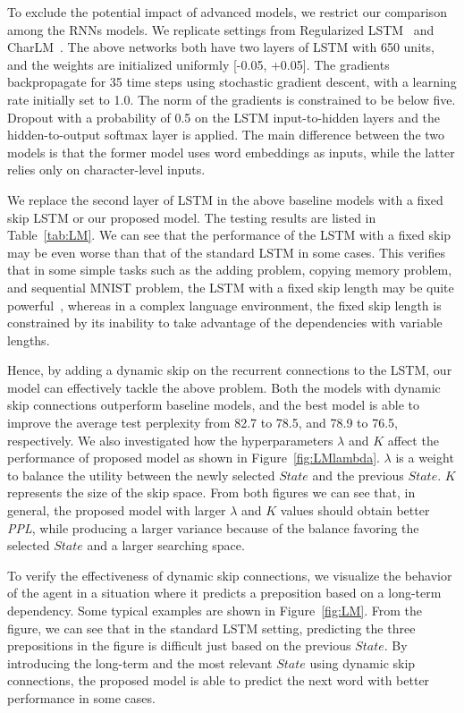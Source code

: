\documentclass[letterpaper]{article} \usepackage{aaai19}  \usepackage{times}  \usepackage{helvet}  \usepackage{courier}  \usepackage{url}  \usepackage{graphicx}  \usepackage{amsmath}
\begin{document}
To exclude the potential impact of advanced models, we restrict our comparison among the RNNs models. We replicate settings from Regularized LSTM~\cite{zaremba2014recurrent} and CharLM~\cite{kim2016character}. The above networks both have two layers of LSTM with 650 units, and the weights are initialized uniformly [-0.05, +0.05]. The gradients backpropagate for 35 time steps using stochastic gradient descent, with a learning rate initially set to 1.0. The norm of the gradients is constrained to be below five. Dropout with a probability of 0.5 on the LSTM input-to-hidden layers and the hidden-to-output softmax layer is applied. The main difference between the two models is that the former model uses word embeddings as inputs, while the latter relies only on character-level inputs.

We replace the second layer of LSTM in the above baseline models with a fixed skip LSTM or our proposed model. The testing results are listed in Table~\ref{tab:LM}. We can see that the performance of the LSTM with a fixed skip may be even worse than that of the standard LSTM in some cases. This verifies that in some simple tasks such as the adding problem, copying memory problem, and sequential MNIST problem, the LSTM with a fixed skip length may be quite powerful~\cite{zhang2016architectural}, whereas in a complex language environment, the fixed skip length is constrained by its inability to take advantage of the dependencies with variable lengths.

Hence, by adding a dynamic skip on the recurrent connections to the LSTM, our model can effectively tackle the above problem. Both the models with dynamic skip connections outperform baseline models, and the best model is able to improve the average test perplexity from 82.7 to 78.5, and 78.9 to 76.5, respectively. We also investigated how the hyperparameters $\lambda$ and $K$ affect the performance of proposed model as shown in Figure~\ref{fig:LMlambda}. $\lambda$ is a weight to balance the utility between the newly selected $State$ and the previous $State$. $K$ represents the size of the skip space. From both figures we can see that, in general, the proposed model with larger $\lambda$ and $K$ values should obtain better \textit{PPL}, while producing a larger variance because of the balance favoring the selected $State$ and a larger searching space.

To verify the effectiveness of dynamic skip connections, we visualize the behavior of the agent in a situation where it predicts a preposition based on a long-term dependency. Some typical examples are shown in Figure~\ref{fig:LM}. From the figure, we can see that in the standard LSTM setting, predicting the three prepositions in the figure is difficult just based on the previous $State$. By introducing the long-term and the most relevant $State$ using dynamic skip connections, the proposed model is able to predict the next word with better performance in some cases.
\end{document}
